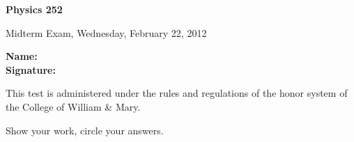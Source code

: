 \documentclass[letterpaper,addpoints,answers]{exam}
\begin{document}

\begin{coverpages}
	\noindent 
  \large\bfseries Physics 252

  \vspace{2ex}
	\noindent 
  Midterm Exam, Wednesday,  February  22, 2012

  \vspace{5ex}
	\noindent 
  \large\bfseries Name:\enspace\makebox[2in]{\hrulefill}\\

  \vspace{5ex}
	\noindent 
  \large\bfseries Signature:\enspace\makebox[2in]{\hrulefill}

  \vspace{5ex}
	\noindent 
	This test is administered under the rules and regulations of the honor 
	system of the College of William \& Mary.  

  \vspace{5ex}
	\noindent 
	Show your work, circle your answers.


  \vspace{5ex}
  \gradetable[v][questions]
\end{coverpages}
 
\end{document}
